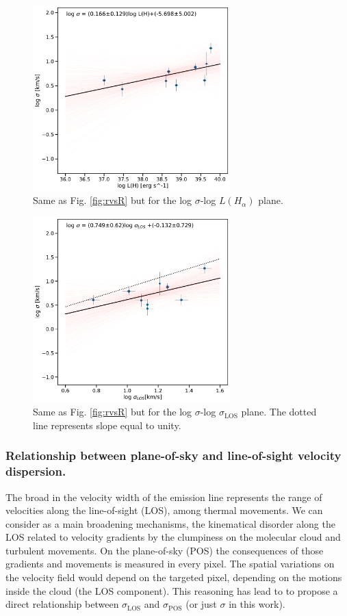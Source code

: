 \documentclass[fleqn,usenatbib, useAMS, a4paper]{mnras}
\begin{document}
\begin{figure}
\centering 
\includegraphics[width=3in]{Figures/svsL}
\caption{Same as Fig. \ref{fig:rvsR} but for the log $\sigma$-log $L(H_{\alpha})$ plane.}
\label{fig:sigvsl}
\end{figure}

\begin{figure}
\centering 
\includegraphics[width=3in]{Figures/svss.pdf}
\caption{Same as Fig. \ref{fig:rvsR} but for the log $\sigma$-log $\sigma_{\text{LOS}}$ plane. The dotted line represents slope equal to unity.}
\label{fig:svss}
\end{figure}

\subsubsection{Relationship between plane-of-sky and line-of-sight velocity dispersion.}

The broad in the velocity width of the emission line represents the range of velocities along the line-of-sight (LOS), among thermal movements. 
We can consider as a main broadening mechanisms, the kinematical disorder along the LOS related to velocity gradients by the clumpiness on the molecular cloud and turbulent movements.
On the plane-of-sky (POS) the consequences of those gradients and movements is measured in every pixel. The spatial variations on the velocity field would depend on the targeted pixel, depending on the motions inside the cloud (the LOS component).
This reasoning has lead to \citet{2011MNRAS.413..705L} to propose a direct relationship between \(\sigma_{\text{LOS}}\) and \(\sigma_{\text{POS}}\) (or just \(\sigma\) in this work).
\end{document}
